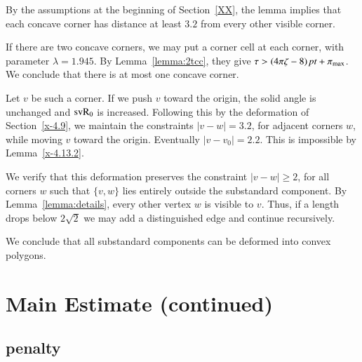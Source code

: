 By the assumptions at the beginning of Section~\ref{XX}, the lemma
implies that each concave corner has distance at least $3.2$ from every
other visible corner.

If there are two concave corners, we may put a corner cell at
each corner, with parameter $\lambda=1.945$.  By Lemma~\ref{lemma:2tcc},
they give $\tau > (4\pi\zeta-8)\,\hbox{\it pt} + \pi_{\max}$.
We conclude that there is at most one concave corner. 

Let $v$ be such a
corner.   
If we push $v$ toward the origin, the solid angle is unchanged
and ${\operatorname{svR}}_0$ is increased.  Following this by the deformation of
Section~\ref{x-4.9}, we maintain the constraints $|v-w|=3.2$, for
adjacent corners $w$, while moving $v$ toward the origin. Eventually
$|v-v_0|=2.2$. This is impossible by Lemma~\ref{x-4.13.2}.

We verify that this deformation preserves the constraint
$|v-w|\ge2$, for all corners $w$ such that $\{v,w\}$ lies entirely
outside the substandard component.  
By Lemma~\ref{lemma:details}, every other vertex $w$
is visible to $v$.  Thus, if a length drops below $2\sqrt2$ we may
add a distinguished edge and continue recursively.

We conclude that all substandard components can be deformed into convex polygons.





\section{Main Estimate (continued)}%




\subsection{penalty} %
    \label{sec:penalty1}


